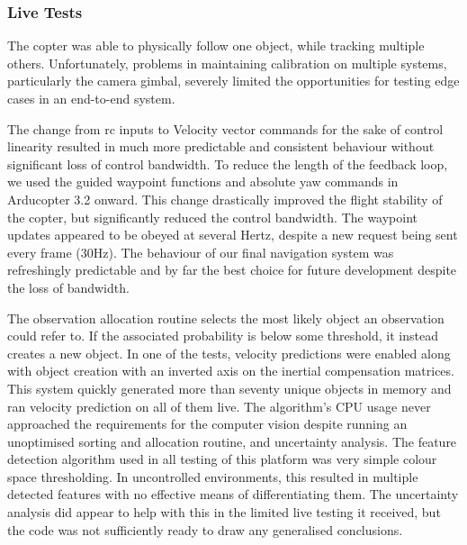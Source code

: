 \documentclass[a4paper, 11pt, titlepage]{article}
\newcounter{subsubsubsection}[subsubsection]
\begin{document}
    \subsubsection{Live Tests}
      The copter was able to physically follow one object, while tracking multiple others.  Unfortunately, problems in maintaining calibration on multiple systems, particularly the camera gimbal, severely limited the opportunities for testing edge cases in an end-to-end system.

        The change from \gls{rc} inputs to Velocity vector commands for the sake of control linearity resulted in much more predictable and consistent behaviour without significant loss of control bandwidth.
        To reduce the length of the feedback loop, we used the guided waypoint functions and absolute yaw commands in Arducopter 3.2 onward.  This change drastically improved the flight stability of the copter, but significantly reduced the control bandwidth.  The waypoint updates appeared to be obeyed at several Hertz, despite a new request being sent every frame (30Hz).
        The behaviour of our final navigation system was refreshingly predictable and by far the best choice for future development despite the loss of bandwidth.
      
        The observation allocation routine selects the most likely object an observation could refer to. If the associated probability is below some threshold, it instead creates a new object.
        In one of the tests, velocity predictions were enabled along with object creation with an inverted axis on the inertial compensation matrices. This system quickly generated more than seventy unique objects in memory and ran velocity prediction on all of them live. The algorithm's CPU usage never approached the requirements for the computer vision despite running an unoptimised sorting and allocation routine, and uncertainty analysis.
        The feature detection algorithm used in all testing of this platform was very simple colour space thresholding.  In uncontrolled environments, this resulted in multiple detected features with no effective means of differentiating them.  The uncertainty analysis did appear to help with this in the limited live testing it received, but the code was not sufficiently ready to draw any generalised conclusions.
\end{document}
